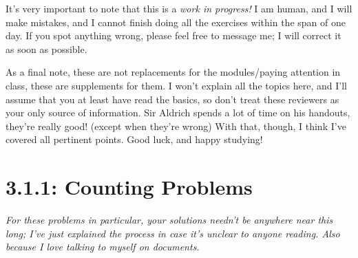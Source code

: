 \documentclass{article}
\begin{document}
It's very important to note that this is a \textit{work in progress!} I am human, and I will make mistakes, and I cannot finish doing all the exercises within the span of one day. If you spot anything wrong, 
please feel free to message me; I will correct it as soon as possible.\par
As a final note, these are not replacements for the modules/paying attention in class, these are supplements for them. I won't explain all the topics here, and I'll assume that you at least have 
read the basics, so don't treat these reviewers as your only source of information. Sir Aldrich spends a lot of time on his handouts, they're really good! (except when they're wrong) With that, though, I think 
I've covered all pertinent points. Good luck, and happy studying!
\pagebreak 

\section*{3.1.1: Counting Problems} 
\textit{For these problems in particular, your solutions needn't be anywhere near this long; I've just explained the process in case it's unclear to anyone reading. Also because I love talking to myself on documents.}
\end{document}
